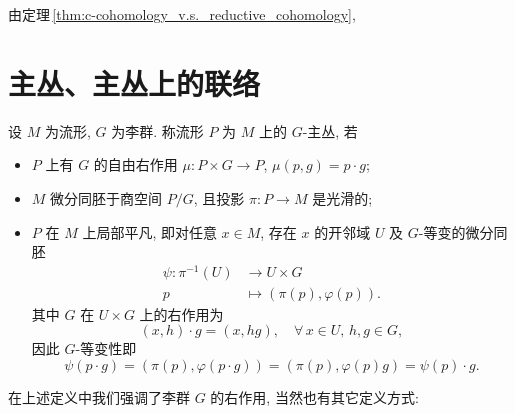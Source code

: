         由定理\,\ref{thm:c-cohomology_v.s._reductive_cohomology}, 
    
    \section{主丛、主丛上的联络}
        \begin{definition}[$G$-主丛]
            设 $M$ 为流形, $G$ 为李群. 称流形 $P$ 为 $M$ 上的 $G$-主丛, 若
            \begin{itemize}
                \item $P$ 上有 $G$ 的自由右作用 
                $\mu:P\times G\rightarrow P$, $\mu(p,g)=p\cdot g$;
                \item $M$ 微分同胚于商空间 $P/G$, 
                且投影 $\pi:P\rightarrow M$ 是光滑的;
                \item $P$ 在 $M$ 上局部平凡, 即对任意 $x\in M$, 
                存在 $x$ 的开邻域 $U$ 及 $G$-等变的微分同胚 
                \begin{align*}
                    \psi:\pi^{-1}(U) & \rightarrow U\times G \\
                    p &\mapsto (\pi(p),\varphi(p)).
                \end{align*}
                其中 $G$ 在 $U\times G$ 上的右作用为 
                \begin{equation*}
                    (x,h)\cdot g = (x,hg), \quad\forall\,x\in U,\,h,g\in G,
                \end{equation*}
                因此 $G$-等变性即 
                \begin{equation*}
                    \psi(p\cdot g) = (\pi(p),\varphi(p\cdot g))
                    = (\pi(p),\varphi(p)g) = \psi(p)\cdot g. 
                \end{equation*}
            \end{itemize}
        \end{definition}
        在上述定义中我们强调了李群 $G$ 的右作用, 当然也有其它定义方式: 
